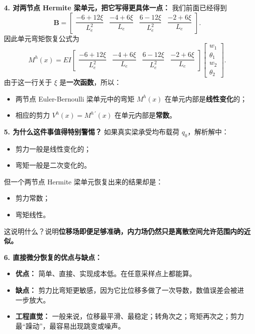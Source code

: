 \documentclass[11pt, a4paper, UTF8]{ctexart}
\begin{document}
\textbf{4. 对两节点 Hermite 梁单元，把它写得更具体一点：}
我们前面已经得到
\[
\bm{B} =
\begin{bmatrix}
\dfrac{-6 + 12\xi}{L_e^2} &
\dfrac{-4 + 6\xi}{L_e} &
\dfrac{6 - 12\xi}{L_e^2} &
\dfrac{-2 + 6\xi}{L_e}
\end{bmatrix}.
\]
因此单元弯矩恢复公式为
\[
M^h(x)
=
EI
\begin{bmatrix}
\dfrac{-6 + 12\xi}{L_e^2} &
\dfrac{-4 + 6\xi}{L_e} &
\dfrac{6 - 12\xi}{L_e^2} &
\dfrac{-2 + 6\xi}{L_e}
\end{bmatrix}
\begin{bmatrix}
w_1 \\ \theta_1 \\ w_2 \\ \theta_2
\end{bmatrix}.
\]
由于这一行关于 $\xi$ 是\textbf{一次函数}，所以：
\begin{itemize}
    \item 两节点 Euler-Bernoulli 梁单元中的弯矩 $M^h(x)$ 在单元内部是\textbf{线性变化}的；
    \item 相应的剪力 $V^h(x)=M^{h\,\prime}(x)$ 在单元内部是\textbf{常数}。
\end{itemize}

\textbf{5. 为什么这件事值得特别警惕？}
如果真实梁承受均布载荷 $q_0$，解析解中：
\begin{itemize}
    \item 剪力一般是线性变化的；
    \item 弯矩一般是二次变化的。
\end{itemize}
但一个两节点 Hermite 梁单元恢复出来的结果却是：
\begin{itemize}
    \item 剪力常数；
    \item 弯矩线性。
\end{itemize}
这说明什么？说明\textbf{位移场即便足够准确，内力场仍然只是离散空间允许范围内的近似。}

\textbf{6. 直接微分恢复的优点与缺点：}
\begin{itemize}
    \item \textbf{优点：} 简单、直接、实现成本低。在任意采样点上都能算。
    \item \textbf{缺点：} 剪力比弯矩更敏感，因为它比位移多做了一次导数，数值误差会被进一步放大。
    \item \textbf{工程直觉：} 一般来说，位移最平滑、最稳定；转角次之；弯矩再次之；剪力最“躁动”，最容易出现跳变或噪声。
\end{itemize}
\end{document}
